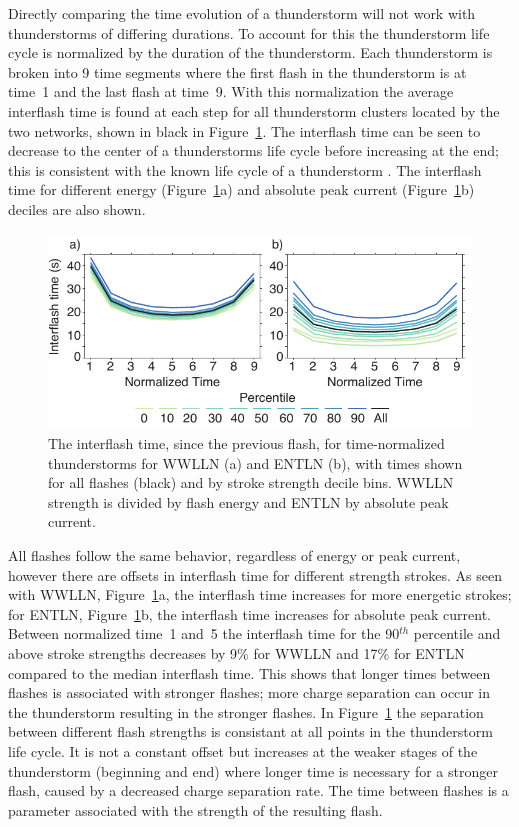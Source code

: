Directly comparing the time evolution of a thunderstorm will not work with thunderstorms of differing durations.
To account for this the thunderstorm life cycle is normalized by the duration of the thunderstorm.
Each thunderstorm is broken into 9 time segments where the first flash in the thunderstorm is at time~1 and the last flash at time~9.
With this normalization the average interflash time is found at each step for all thunderstorm clusters located by the two networks, shown in black in Figure~\ref{thunderstorm:fig:timerate}.
The interflash time can be seen to decrease to the center of a thunderstorms life cycle before increasing at the end; this is consistent with the known life cycle of a thunderstorm \citep{Peckham1984,Rakov2003}.
The interflash time for different energy (Figure~\ref{thunderstorm:fig:timerate}a) and absolute peak current (Figure~\ref{thunderstorm:fig:timerate}b) deciles are also shown.

\begin{figure}[ht!]
   \centering
   \includegraphics[scale=1]{thunderstorm/Figures/stormTimeRate.pdf}
   \caption{The interflash time, since the previous flash, for time-normalized thunderstorms for WWLLN (a) and ENTLN (b), with times shown for all flashes (black) and by stroke strength decile bins.
     WWLLN strength is divided by flash energy and ENTLN by absolute peak current.}
   \label{thunderstorm:fig:timerate}
\end{figure}

All flashes follow the same behavior, regardless of energy or peak current, however there are offsets in interflash time for different strength strokes.
As seen with WWLLN, Figure~\ref{thunderstorm:fig:timerate}a, the interflash time increases for more energetic strokes; for ENTLN, Figure~\ref{thunderstorm:fig:timerate}b, the interflash time increases for absolute peak current.
Between normalized time~1 and~5 the interflash time for the 90$^{th}$ percentile and above stroke strengths decreases by 9\% for WWLLN and 17\% for ENTLN compared to the median interflash time.
This shows that longer times between flashes is associated with stronger flashes; more charge separation can occur in the thunderstorm resulting in the stronger flashes.
In Figure~\ref{thunderstorm:fig:timerate} the separation between different flash strengths is consistant at all points in the thunderstorm life cycle.
It is not a constant offset but increases at the weaker stages of the thunderstorm (beginning and end) where longer time is necessary for a stronger flash, caused by a decreased charge separation rate.
The time between flashes is a parameter associated with the strength of the resulting flash.


